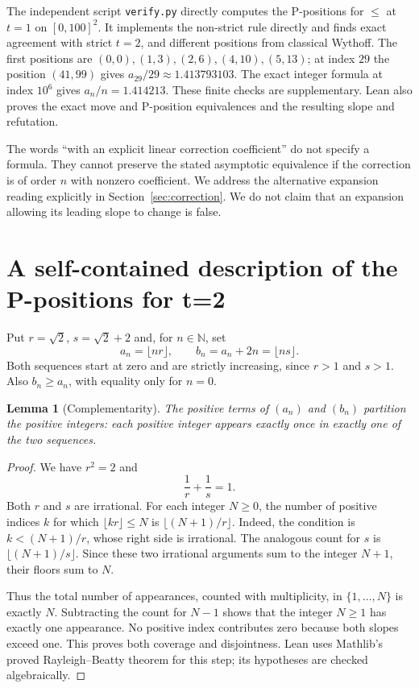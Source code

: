 \documentclass[11pt]{article}
\newtheorem{lemma}{Lemma}
\newcommand{\N}{\mathbb N}
\begin{document}
The independent script \texttt{verify.py} directly computes the
P-positions for $\le$ at $t=1$ on $[0,100]^2$. It implements the
non-strict rule directly and finds exact agreement with strict $t=2$,
and different positions from classical Wythoff.
The first positions are $(0,0),(1,3),(2,6),(4,10),(5,13)$; at index
$29$ the position $(41,99)$ gives $a_{29}/29\approx1.413793103$.
The exact integer formula at index $10^6$ gives
$a_n/n=1.414213$.
These finite checks are supplementary. Lean also proves the exact
move and P-position equivalences and the resulting slope and refutation.

The words ``with an explicit linear correction coefficient'' do not specify a formula. They cannot preserve the stated asymptotic equivalence if the correction is of order $n$ with nonzero coefficient. We address the alternative expansion reading explicitly in Section~\ref{sec:correction}. We do not claim that an expansion allowing its leading slope to change is false.

\section{A self-contained description of the P-positions for t=2}
Put $r=\sqrt2$, $s=\sqrt2+2$ and, for $n\in\N$, set
\[
a_n=\lfloor nr\rfloor,\qquad b_n=a_n+2n=\lfloor ns\rfloor.
\]
Both sequences start at zero and are strictly increasing, since $r>1$ and $s>1$. Also $b_n\ge a_n$, with equality only for $n=0$.

\begin{lemma}[Complementarity]
The positive terms of $(a_n)$ and $(b_n)$ partition the positive integers: each positive integer appears exactly once in exactly one of the two sequences.
\end{lemma}
\begin{proof}
We have $r^2=2$ and
\[
\frac1r+\frac1s=1.
\]
Both $r$ and $s$ are irrational. For each integer $N\ge0$, the number of positive indices $k$ for which $\lfloor kr\rfloor\le N$ is
$\lfloor (N+1)/r\rfloor$. Indeed, the condition is $k<(N+1)/r$, whose right side is irrational. The analogous count for $s$ is $\lfloor (N+1)/s\rfloor$. Since these two irrational arguments sum to the integer $N+1$, their floors sum to $N$.

Thus the total number of appearances, counted with multiplicity, in $\{1,\ldots,N\}$ is exactly $N$. Subtracting the count for $N-1$ shows that the integer $N\ge1$ has exactly one appearance. No positive index contributes zero because both slopes exceed one. This proves both coverage and disjointness. Lean uses Mathlib's proved Rayleigh--Beatty theorem for this step; its hypotheses are checked algebraically.
\end{proof}
\end{document}
